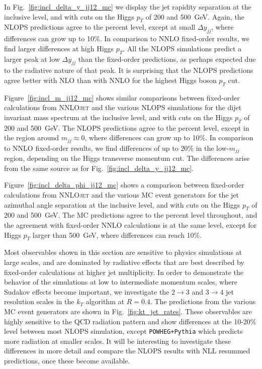 \documentclass[10pt,prd,fleqn,superscriptaddress,notitlepage,nofootinbib,preprintnumbers,nobalancelastpage]{revtex4-1}
\newcommand{\NNLOJET}{\textsc{NNLOjet}\xspace}
\begin{document}
In Fig.~\ref{fig:incl_delta_y_jj12_mc} we display the jet rapidity separation at the inclusive level, and with cuts on the Higgs $p_T$ of 200 and 500~GeV. Again, the NLOPS predictions agree to the percent level, except at small $\Delta y_{jj}$, where differences can grow up to 10\%. In comparison to NNLO fixed-order results, we find larger differences at high Higgs $p_T$. All the NLOPS simulations predict a larger peak at low $\Delta y_{jj}$ than the fixed-order predictions, as perhaps expected due to the radiative nature of that peak. It is surprising that the NLOPS predictions agree better with NLO than with NNLO for the highest Higgs boson $p_T$ cut.

Figure~\ref{fig:incl_m_jj12_mc} shows similar comparisons between fixed-order calculations from \NNLOJET and the various NLOPS simulations for the dijet invariant mass spectrum at the inclusive level, and with cuts on the Higgs $p_T$ of 200 and 500~GeV. The NLOPS predictions agree to the percent level, except in the region around $m_{jj}\approx0$, where differences can grow up to 10\%. In comparison to NNLO fixed-order results, we find differences of up to 20\% in the low-$m_{jj}$ region, depending on the Higgs transverse momentum cut. The differences arise from the same source as for Fig.~\ref{fig:incl_delta_y_jj12_mc}.



Figure~\ref{fig:incl_delta_phi_jj12_mc} shows a comparison between fixed-order calculations from \NNLOJET and the various MC event generators for the jet azimuthal angle separation at the inclusive level, and with cuts on the Higgs $p_T$ of 200 and 500~GeV. The MC predictions agree to the percent level throughout, and the agreement with fixed-order NNLO calculations is at the same level, except for Higgs $p_T$ larger than 500~GeV, where differences can reach 10\%.


Most observables shown in this section are sensitive to physics simulations
at large scales, and are dominated by radiative effects that are best described by
fixed-order calculations at higher jet multiplicity. In order to demonstrate the
behavior of the simulations at low to intermediate momentum scales, where Sudakov
effects become important, we investigate the $2\to3$ and $3\to4$ jet resolution scales
in the $k_T$ algorithm at $R=0.4$. The predictions from the various MC event generators
are shown in Fig.~\ref{fig:kt_jet_rates}. These observables are highly sensitive
to the QCD radiation pattern and show differences at the 10-20\% level between most
NLOPS simulation, except {\tt POWHEG+Pythia} which predicts more radiation at smaller scales.
It will be interesting to investigate these differences in more detail and compare
the NLOPS results with NLL resummed predictions, once these become available.
\end{document}
